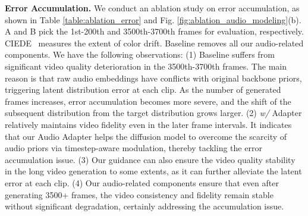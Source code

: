 \begin{table}[t!]\small
\caption{Ablation study on the error accumulation. Adapter and G refer to our Audio Adapter and Audio Native Guidance.
}
\vspace{-0.2in}
\begin{center}
\renewcommand\arraystretch{1.1}
\end{center}
\label{table:ablation_error}
\vspace{-0.3in}
\end{table}

\noindent\textbf{Error Accumulation.}
We conduct an ablation study on error accumulation, as shown in Table \ref{table:ablation_error} and Fig. \ref{fig:ablation_audio_modeling}(b). 
A and B pick the 1st-200th and 3500th-3700th frames for evaluation, respectively. CIEDE~\cite{sharma2005ciede2000} measures the extent of color drift.
Baseline removes all our audio-related components.
We have the following observations: 
(1) Baseline suffers from significant video quality deterioration in the 3500th-3700th frames. The main reason is that raw audio embeddings have conflicts with original backbone priors, triggering latent distribution error at each clip.
As the number of generated frames increases, error accumulation becomes more severe, and the shift of the subsequent distribution from the target distribution grows larger.
(2) \textit{w/} Adapter relatively maintains video fidelity even in the later frame intervals. It indicates that our Audio Adapter helps the diffusion model to overcome the scarcity of audio priors via timestep-aware modulation, thereby tackling the error accumulation issue.
(3) Our guidance can also ensure the video quality stability in the long video generation to some extents, as it can further alleviate the latent error at each clip. 
(4) Our audio-related components ensure that even after generating 3500+ frames, the video consistency and fidelity remain stable without significant degradation, certainly addressing the accumulation issue.


